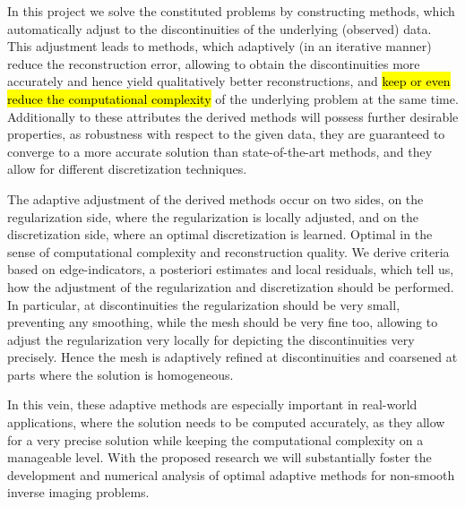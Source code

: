 \documentclass[enabledeprecatedfontcommands,cleardoublepage=empty,headsepline,twoside,11pt,DIV=15,BCOR=12mm,final]{scrartcl}
\begin{document}
In this project we solve the constituted problems by constructing methods, which automatically adjust to the discontinuities of the underlying (observed) data. This adjustment leads to methods, which adaptively (in an iterative manner) reduce the reconstruction error, allowing to obtain the discontinuities more accurately and hence yield qualitatively better reconstructions, and \hl{keep or even reduce the computational complexity}   of the underlying problem at the same time. Additionally to these attributes the derived methods will possess further desirable properties, as robustness with respect to the given data, they are guaranteed to converge to a more accurate solution than state-of-the-art methods, and they allow for different discretization techniques. 

The adaptive adjustment of the derived methods occur on two sides, on the regularization side, where the regularization is locally adjusted, and on the discretization side, where an optimal discretization is learned. Optimal in the sense of computational complexity and reconstruction quality. We derive criteria based on edge-indicators, a posteriori estimates and local residuals, which tell us, how the adjustment of the regularization and discretization should be performed. In particular, at discontinuities the regularization should be very small, preventing any smoothing, while the mesh should be very fine too, allowing to adjust the regularization very locally for depicting the discontinuities very precisely. Hence the mesh is adaptively refined at discontinuities and coarsened at parts where the solution is homogeneous.



In this vein, these adaptive methods are especially important in real-world applications, where the solution needs to be computed accurately, as they allow for a very precise solution while keeping the computational complexity on a manageable level. With the proposed research we will substantially foster the development and numerical analysis of optimal adaptive methods for non-smooth inverse imaging problems. %
\end{document}
